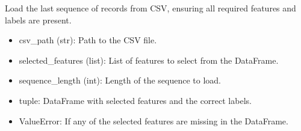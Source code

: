 \documentclass[letterpaper,10pt,english]{sphinxmanual}
\begin{document}
\begin{fulllineitems}
\label{\detokenize{network_watcher:network_watcher.load_last_sequence}}
\pysigstartsignatures
{}
\pysigstopsignatures
\sphinxAtStartPar
Load the last sequence of records from CSV, ensuring all required features and labels are present.
\begin{description}
\begin{itemize}
\item {} 
\sphinxAtStartPar
csv\_path (str): Path to the CSV file.

\item {} 
\sphinxAtStartPar
selected\_features (list): List of features to select from the DataFrame.

\item {} 
\sphinxAtStartPar
sequence\_length (int): Length of the sequence to load.

\end{itemize}

\begin{itemize}
\item {} 
\sphinxAtStartPar
tuple: DataFrame with selected features and the correct labels.

\end{itemize}

\begin{itemize}
\item {} 
\sphinxAtStartPar
ValueError: If any of the selected features are missing in the DataFrame.

\end{itemize}

\end{description}

\end{fulllineitems}

\end{document}

